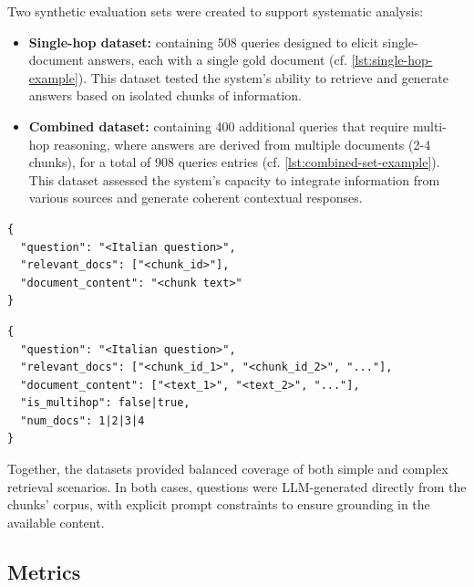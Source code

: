\begin{spacing}{1.5}
Two synthetic evaluation sets were created to support systematic analysis:
\begin{itemize}
      \item \textbf{Single-hop dataset:} containing 508 queries designed to elicit single-document answers, each with a single gold document (cf. \autoref{lst:single-hop-example}). This dataset tested the system's ability to retrieve and generate answers based on isolated chunks of information.
      \item \textbf{Combined dataset:} containing 400 additional queries that require multi-hop reasoning, where answers are derived from multiple documents (2-4 chunks), for a total of 908 queries entries (cf. \autoref{lst:combined-set-example}). This dataset assessed the system's capacity to integrate information from various sources and generate coherent contextual responses.
\end{itemize}


\begin{lstlisting}[frame=none,
                   caption={JSON output format for single-hop dataset items.},
                   captionpos=b,
                   label={lst:single-hop-example},
  xleftmargin=0.2\textwidth,
  xrightmargin=0.2\textwidth]
{
  "question": "<Italian question>",
  "relevant_docs": ["<chunk_id>"],
  "document_content": "<chunk text>"
}
\end{lstlisting}

\vspace{0.6em}

\begin{lstlisting}[frame=none,
                   caption={JSON output format for combined dataset items, including single-hop and multi-hop questions.},
                   captionpos=b,
                   label={lst:combined-set-example},
  xleftmargin=0.05\textwidth,
  xrightmargin=0.05\textwidth]
{
  "question": "<Italian question>",
  "relevant_docs": ["<chunk_id_1>", "<chunk_id_2>", "..."],
  "document_content": ["<text_1>", "<text_2>", "..."],
  "is_multihop": false|true,
  "num_docs": 1|2|3|4
}
\end{lstlisting}
\vspace{0.6em}

Together, the datasets provided balanced coverage of both simple and complex retrieval scenarios. In both cases, questions were LLM-generated directly from the chunks' corpus, with explicit prompt constraints to ensure grounding in the available content.


\subsection{Metrics}\label{sec:metrics}



\end{spacing}
